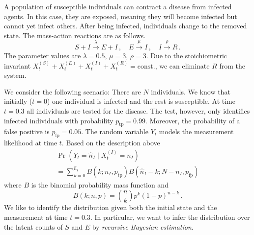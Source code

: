 \begin{model}\label{model:seir}
  A population of susceptible individuals can contract a disease from
  infected agents. In this case, they are exposed, meaning they will
  become infected but cannot yet infect others. After being infected,
  individuals change to the removed state. The mass-action reactions
  are as follows.
  \[ S + I \xrightarrow{\lambda} E + I\,, \quad
    E \xrightarrow{\mu} I\,, \quad
  I \xrightarrow{\rho} R\,. \]
  The parameter values are $\lambda=0.5$, $\mu=3$, $\rho=3$. Due to
  the stoichiometric invariant $X_t^{(S)} + X_t^{(E)} + X_t^{(I)} +
  X_t^{(R)} = \mathrm{const.}$, we can eliminate $R$ from the system.
\end{model}

We consider the following scenario:
There are $N$ individuals.
We know that initially ($t=0$) one individual is infected and the
rest is susceptible.
At time $t=0.3$ all individuals are tested for the disease.
The test, however, only identifies infected individuals with probability
$p_{\text{tp}}= 0.99$.
Moreover, the probability of a false positive is $p_{\text{fp}} = 0.05$.
The random variable $Y_t$ models the measurement likelihood at time $t$.
Based on the description above
\begin{multline*}
  \Pr(Y_t=\hat{n}_I\mid X_t^{(I)} = n_I)\\
  =
  \sum_{k=0}^{\hat{n}_I} B(k; {n_I}, p_{\text{tp}}) B(\hat{n}_I - k ;
  N - n_I, p_{\text{fp}})
\end{multline*}
where $B$ is the binomial probability mass function and
\[
  B(k; n, p) = \binom{n}{k}p^k(1 - p)^{n -  k}\,.
\]
We like to identify the distribution given both the initial state and
the measurement at time $t=0.3$.
In particular, we want to infer the distribution over the latent
counts of  $S$ and $E$ by
\emph{recursive Bayesian estimation}.

